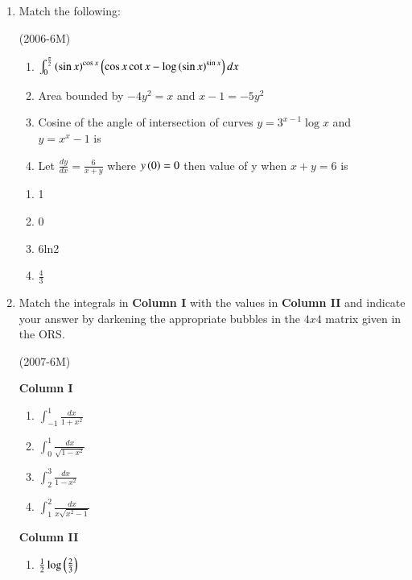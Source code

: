 \documentclass[journal,12pt,twocolumn]{IEEEtran}
\theoremstyle{remark}
\begin{document}
	\begin{enumerate}
		\item Match the following:

			\hfill{(2006-6M)}
			\begin{multicols}{2}
				\begin{enumerate}
				\item	$\int_{0}^{\frac{\pi}{2}} \left({\sin x}\right)^{\cos x} \left(\cos x\cot x-\log\left(\sin x\right)^{\sin x}\right) dx $
				\item Area bounded by $-4y^{2}=x$ and $x-1=-5y^{2}$
				\item Cosine of the angle of intersection of curves $y=3^{x-1}\log x$ and $y=x^{x}-1$ is
				\item Let $\frac{dy}{dx}=\frac{6}{x+y}$ where $y\left(0\right)=0$ then value of y when $x+y=6$ is
				\end{enumerate}
			\columnbreak
				\begin{enumerate}
					\item 1
						
					\item 0

					\item 6ln2

					\item $\frac{4}{3}$
						
				\end{enumerate}
				\end{multicols}
			\item Match the integrals in \textbf{Column I} with the values in \textbf{Column II} and indicate your answer by darkening the appropriate bubbles in the $4x4$ matrix given in the ORS. 

			\hfill{(2007-6M)}
			\begin{multicols}{2}
				\textbf{Column I}

				\begin{enumerate}
					\item $\int_{-1}^{1}\frac{dx}{1+x^{2}}$
					\item $\int_{0}^{1}\frac{dx}{\sqrt{1-x^{2}}}$
					\item $\int_{2}^{3}\frac{dx}{1-x^{2}}$
					\item $\int_{1}^{2}\frac{dx}{x\sqrt{x^{2}-1}}$
				\end{enumerate}
			\columnbreak
				\textbf{Column II}
				\begin{enumerate}
					\item $\frac{1}{2}\log\left(\frac{2}{3}\right)$


\end{enumerate}
\end{multicols}
\end{enumerate}
\end{document}
